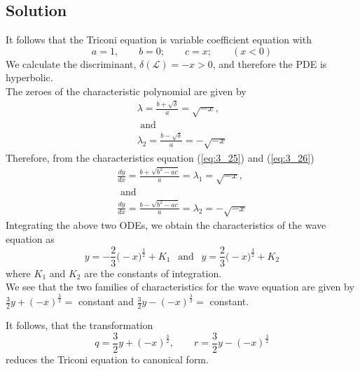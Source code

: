 \documentclass[11pt]{report}
\newcommand{\Laplace}{\mathcal{L}}
\newcommand{\NI}{\noindent}
\newcommand{\sps}{\\[0.2cm]}
\newcommand{\refn}[1]{(\ref{#1})}
\newcommand{\refx}[1]{\refn{eq:#1}}
\newcommand{\dsp}{\displaystyle}
\begin{document}
	\subsection*{Solution}
	It follows that the Triconi equation is variable coefficient equation with
	\begin{equation*}
		a=1,\qquad b=0;\qquad c=x;\qquad (x<0)\label{ex:3_3_2} 
	\end{equation*}
	We calculate the discriminant, $\delta(\Laplace) = -x > 0$, and therefore the PDE is hyperbolic.\sps
	The zeroes of the characteristic polynomial are given by
	\begin{equation*}
		\begin{array}{l}
			\dsp\lambda = \frac{b+\sqrt{\delta}}{a} = \sqrt{-x},\\
			\text{ and }\\
			\dsp\lambda_2= \frac{b-\sqrt{\delta}}{a}= -\sqrt{-x}
		\end{array}\label{ex:3_3_3} 
	\end{equation*}
	Therefore, from the characteristics equation \refx{3_25} and \refx{3_26}
	\begin{equation*}
	\begin{array}{l}
			\dsp\frac{dy}{dx} = \frac{b+\sqrt{b^2-ac}}{a} = \lambda_1 = \sqrt{-x},\\
			\text{ and }\\
			\dsp\frac{dy}{dx}= \frac{b-\sqrt{b^2-ac}}{a}=\lambda_2 = -\sqrt{-x}
	\end{array}\label{ex:3_3_4} 
	\end{equation*}
	Integrating the above two ODEs, we obtain the characteristics of the wave equation as
	\begin{equation*}
		y=-\frac{2}{3}\Big(-x\Big)^{\frac{3}{2}} + K_1 ~~\text{ and }~~ y =\frac{2}{3}\Big(-x\Big)^{\frac{3}{2}} + K_2 \label{ex:3_3_5} 
	\end{equation*}
	where $K_1$ and $K_2$ are the constants of integration.\\
	
	\NI We see that the two families of characteristics for the wave equation are given by $\dsp \frac{3}{2}y+(-x)^{\frac{3}{2}}=$ constant and $\dsp \frac{3}{2}y-(-x)^{\frac{3}{2}}=$ constant.
	
	\NI It follows, that the transformation
	\begin{equation*}
		q = \frac{3}{2}y+(-x)^{\frac{3}{2}}, \qquad  r=\frac{3}{2}y-(-x)^{\frac{3}{2}}\label{ex:3_3_6} 
	\end{equation*}
	reduces the Triconi equation to canonical form.
	
\end{document}

